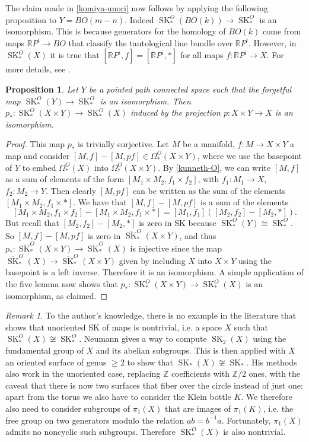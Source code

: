 \documentclass{amsart}
\newtheorem{prop}[thm]{Proposition}
\theoremstyle{definition}
\theoremstyle{remark}
\newtheorem*{rmk}{Remark}
\newcommand{\Z}{\mathbb{Z}}
\newcommand{\SK}{\operatorname{SK}}
\newcommand{\RP}{\mathbb{R}P}
\newcommand{\bSK}{\overline{\SK}}
\begin{document}
The claim made in \cref{komiya-unori} now follows by applying the following proposition to $Y=BO(m-n)$. Indeed $\SK_*^O(BO(k))\to\SK_*^O$ is an isomorphism. This is because generators for the homology of $BO(k)$ come from maps $\RP^i\to BO$ that classify the tautological line bundle over $\RP^i$. However, in $\SK_*^O(X)$ it is true that $[\RP^i,f]=[\RP^i,*]$ for all maps $f:\RP^i\to X$. For more details, see \cite[Thm 2.11]{skbook}.

\begin{prop}
\label{remove-BO}
    Let $Y$ be a pointed path connected space such that the forgetful map $\SK_*^O(Y)\to\SK_*^O$ is an isomorphism. Then $p_*:\SK_*^O(X\times Y)\to\SK_*^O(X)$ induced by the projection $p:X\times Y\to X$ is an isomorphism.
\end{prop}
\begin{proof}
    This map $p_*$ is trivially surjective. Let $M$ be a manifold, $f:M\to X\times Y$ a map and consider $[M,f]-[M,pf]\in\Omega_*^O(X\times Y)$, where we use the basepoint of $Y$ to embed $\Omega_*^O(X)$ into $\Omega_*^O(X\times Y)$. By \cref{kunneth-O}, we can write $[M,f]$ as a sum of elements of the form $[M_1\times M_2,f_1\times f_2]$, with $f_1:M_1\to X$, $f_2:M_2\to Y$. Then clearly $[M,pf]$ can be written as the sum of the elements $[M_1\times M_2,f_1\times *]$. We have that $[M,f]-[M,pf]$ is a sum of the elements
    \[[M_1\times M_2,f_1\times f_2] - [M_1\times M_2,f_1\times *] = [M_1,f_1]([M_2,f_2]-[M_2,*]).\]
    But recall that $[M_2,f_2]-[M_2,*]$ is zero in SK because $\SK_*^O(Y)\cong \SK_*^O$. So $[M,f]-[M,pf]$ is zero in $\bSK_*^O(X\times Y)$, and thus $p_*:\bSK_*^O(X\times Y)\to\bSK_*^O(X)$ is injective since the map $\bSK_*^O(X)\to\bSK_*^O(X\times Y)$ given by including $X$ into $X\times Y$ using the basepoint is a left inverse. Therefore it is an isomorphism. A simple application of the five lemma now shows that $p_*:\SK_*^O(X\times Y)\to \SK_*^O(X)$ is an isomorphism, as claimed.
\end{proof}

\begin{rmk}
    To the author's knowledge, there is no example in the literature that shows that unoriented SK of maps is nontrivial, i.e. a space $X$ such that $\SK^O_*(X)\not\cong\SK^O_*$. Neumann \cite[Theorem 2]{neumann1975} gives a way to compute $\SK_2(X)$ using the fundamental group of $X$ and its abelian subgroups. This is then applied with $X$ an oriented surface of genus $\geq 2$ to show that $\SK_*(X)\not\cong\SK_*$. His methods also work in the unoriented case, replacing $\Z$ coefficients with $\Z/2$ ones, with the caveat that there is now two surfaces that fiber over the circle instead of just one: apart from the torus we also have to consider the Klein bottle $K$. We therefore also need to consider subgroups of $\pi_1(X)$ that are images of $\pi_1(K)$, i.e. the free group on two generators modulo the relation $ab = b^{-1}a$. Fortunately, $\pi_1(X)$ admits no noncyclic such subgroups. Therefore $\SK_*^O(X)$ is also nontrivial.
\end{rmk}
\end{document}
